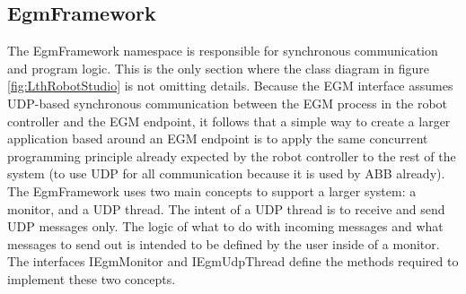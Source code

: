 \documentclass{cslthse-msc}
\begin{document}
\subsection{EgmFramework}
\label{sec:Result:LthRobotStudio:EgmFramework}
The EgmFramework namespace is responsible for synchronous communication and program logic. This is the only section where the class diagram in figure \ref{fig:LthRobotStudio} is not omitting details. Because the EGM interface assumes UDP-based synchronous communication between the EGM process in the robot controller and the EGM endpoint, it follows that a simple way to create a larger application based around an EGM endpoint is to apply the same concurrent programming principle already expected by the robot controller to the rest of the system (to use UDP for all communication because it is used by ABB already). The EgmFramework uses two main concepts to support a larger system: a monitor, and a UDP thread. The intent of a UDP thread is to receive and send UDP messages only. The logic of what to do with incoming messages and what messages to send out is intended to be defined by the user inside of a monitor. The interfaces IEgmMonitor and IEgmUdpThread define the methods required to implement these two concepts.\par
\end{document}

